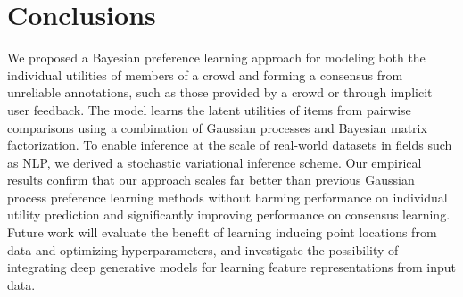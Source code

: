 \section{Conclusions}

We proposed a Bayesian preference learning approach 
for modeling both the individual utilities of members of a crowd 
and forming a consensus from 
unreliable annotations, such as those provided by a crowd or through implicit user feedback.
The model learns the latent utilities of items from pairwise comparisons using a combination of Gaussian processes and Bayesian matrix factorization.
To enable inference at the scale of real-world datasets in fields such as NLP,
we derived a stochastic variational inference scheme.
Our empirical results confirm that our approach scales far better than previous
Gaussian process preference learning methods without harming  
performance on individual utility prediction and significantly improving performance
on consensus learning.
Future work will evaluate the benefit of learning inducing point locations from data and
optimizing hyperparameters,
and investigate the possibility of integrating deep generative models 
for learning feature representations from input data.

